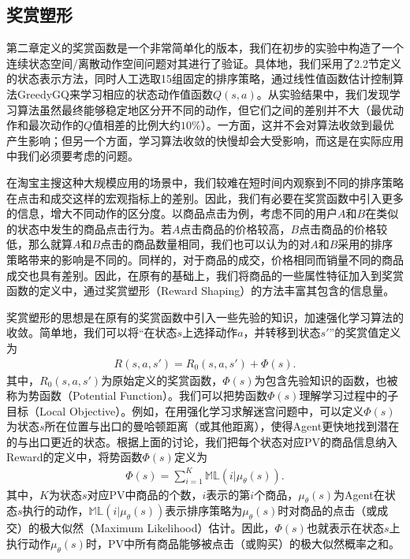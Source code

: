 \subsection{奖赏塑形}
第二章定义的奖赏函数是一个非常简单化的版本，我们在初步的实验中构造了一个连续状态空间/离散动作空间问题对其进行了验证。具体地，我们采用了2.2节定义的状态表示方法，同时人工选取15组固定的排序策略，通过线性值函数估计控制算法GreedyGQ来学习相应的状态动作值函数$Q(s,a)$。从实验结果中，我们发现学习算法虽然最终能够稳定地区分开不同的动作，但它们之间的差别并不大（最优动作和最次动作的$Q$值相差的比例大约$10\%$）。一方面，这并不会对算法收敛到最优产生影响；但另一个方面，学习算法收敛的快慢却会大受影响，而这是在实际应用中我们必须要考虑的问题。

在淘宝主搜这种大规模应用的场景中，我们较难在短时间内观察到不同的排序策略在点击和成交这样的宏观指标上的差别。因此，我们有必要在奖赏函数中引入更多的信息，增大不同动作的区分度。以商品点击为例，考虑不同的用户$A$和$B$在类似的状态中发生的商品点击行为。若$A$点击商品的价格较高，$B$点击商品的价格较低，那么就算$A$和$B$点击的商品数量相同，我们也可以认为的对$A$和$B$采用的排序策略带来的影响是不同的。同样的，对于商品的成交，价格相同而销量不同的商品成交也具有差别。因此，在原有的基础上，我们将商品的一些属性特征加入到奖赏函数的定义中，通过奖赏塑形（Reward Shaping）的方法丰富其包含的信息量。

奖赏塑形的思想是在原有的奖赏函数中引入一些先验的知识，加速强化学习算法的收敛。简单地，我们可以将“在状态$s$上选择动作$a$，并转移到状态$s'$”的奖赏值定义为
\begin{align}
 R(s,a,s' ) = R_0(s,a,s') + \Phi(s). 
\end{align}
 其中，$R_0(s,a,s')$为原始定义的奖赏函数，$\Phi(s)$为包含先验知识的函数，也被称为势函数（Potential Function）。我们可以把势函数$\Phi(s)$理解学习过程中的子目标（Local Objective）。例如，在用强化学习求解迷宫问题中，可以定义$\Phi(s)$为状态$s$所在位置与出口的曼哈顿距离（或其他距离），使得Agent更快地找到潜在的与出口更近的状态。根据上面的讨论，我们把每个状态对应PV的商品信息纳入Reward的定义中，将势函数$\Phi(s)$定义为
\begin{align}
 \Phi(s) = \sum_{i=1}^K \mathbb{M}\mathbb{L}(i|\mu_{\theta}(s)). 
\end{align}
 其中，$K$为状态$s$对应PV中商品的个数，$i$表示的第$i$个商品，$\mu_{\theta}(s)$为Agent在状态$s$执行的动作，$\mathbb{M}\mathbb{L}(i|\mu_{\theta}(s))$表示排序策略为$\mu_{\theta}(s)$时对商品的点击（或成交）的极大似然（Maximum Likelihood）估计。因此，$\Phi(s)$也就表示在状态$s$上执行动作$\mu_{\theta}(s)$时，PV中所有商品能够被点击（或购买）的极大似然概率之和。

